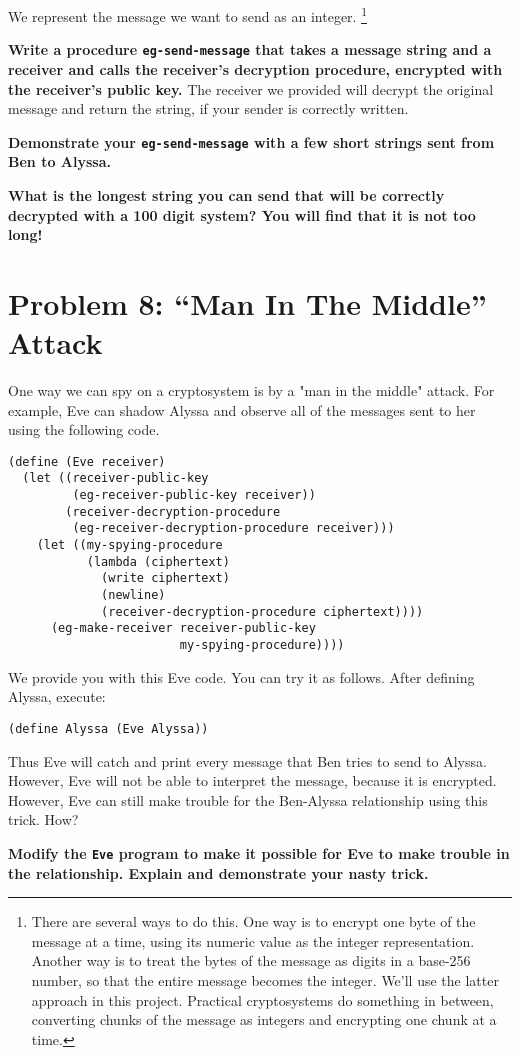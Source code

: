 We represent the message we want to send as an integer.%
\footnote{There are several ways
  to do this.  One way is to encrypt one byte of the message at a 
  time, using its numeric value as the integer
  representation.  Another way is to treat the bytes of the
  message as digits in a base-256 number, so that the entire 
  message becomes the integer.
  We'll use the latter approach in this project.  Practical
  cryptosystems do
  something in between, converting chunks of the message as integers and
  encrypting one chunk at a time.}  

{\bf Write a procedure {\tt eg-send-message} that takes a message
string and a receiver and calls the receiver's decryption procedure,
encrypted with the receiver's public key.}  The receiver we provided
will decrypt the original message and return the string, if your
sender is correctly written.

{\bf Demonstrate your {\tt eg-send-message} with a few short strings
sent from Ben to Alyssa.}

{\bf What is the longest string you can send that will be correctly
decrypted with a 100 digit system?  You will find that it is not too
long!}

\section*{Problem 8: ``Man In The Middle'' Attack}

One way we can spy on a cryptosystem is by a "man in the middle"
attack.  For example, Eve can shadow Alyssa and observe all of the
messages sent to her using the following code.
\begin{verbatim}
(define (Eve receiver)
  (let ((receiver-public-key
         (eg-receiver-public-key receiver))
        (receiver-decryption-procedure
         (eg-receiver-decryption-procedure receiver)))
    (let ((my-spying-procedure
           (lambda (ciphertext)
             (write ciphertext)
             (newline)
             (receiver-decryption-procedure ciphertext))))
      (eg-make-receiver receiver-public-key
                        my-spying-procedure))))
\end{verbatim}
We provide you with this Eve code.  You can try it as follows.  After
defining Alyssa, execute:
\begin{verbatim}
(define Alyssa (Eve Alyssa))
\end{verbatim}
Thus Eve will catch and print every message that Ben tries to send to Alyssa.
However, Eve will not be able to interpret the message, because it is
encrypted.  However, Eve can still make trouble for the Ben-Alyssa
relationship using this trick.  How?

{\bf Modify the {\tt Eve} program to make it possible for Eve to make
trouble in the relationship.  Explain and demonstrate your nasty
trick.}


